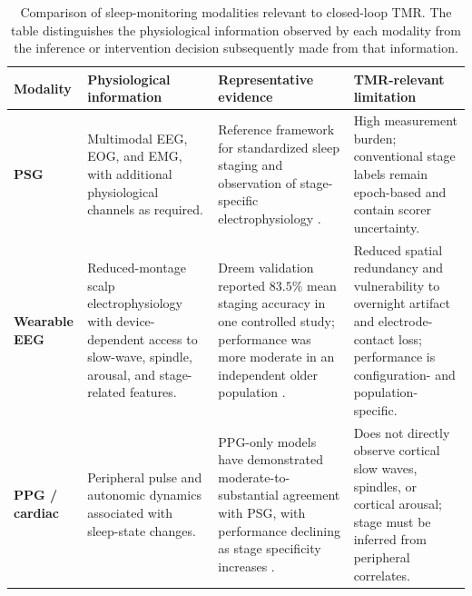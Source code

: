 \begin{table}[t]

\centering

\caption{
Comparison of sleep-monitoring modalities relevant to closed-loop TMR.
The table distinguishes the physiological information observed by each modality
from the inference or intervention decision subsequently made from that
information.
}

\label{tab:sensing_modalities_conceptual}

\footnotesize
\setlength{\tabcolsep}{4pt}
\renewcommand{\arraystretch}{1.22}

\begin{tabularx}{\textwidth}{
@{}
>{\raggedright\arraybackslash}p{2.1cm}
>{\raggedright\arraybackslash}X
>{\raggedright\arraybackslash}X
>{\raggedright\arraybackslash}X
@{}
}

\toprule

\textbf{Modality}
&
\textbf{Physiological information}
&
\textbf{Representative evidence}
&
\textbf{TMR-relevant limitation}
\\

\midrule

\textbf{PSG}
&
Multimodal EEG, EOG, and EMG, with additional physiological channels as
required.
&
Reference framework for standardized sleep staging and observation of
stage-specific electrophysiology
\citep{silber2007scoring}.
&
High measurement burden; conventional stage labels remain epoch-based and
contain scorer uncertainty.
\\

\addlinespace[1.2mm]

\textbf{Wearable EEG}
&
Reduced-montage scalp electrophysiology with device-dependent access to
slow-wave, spindle, arousal, and stage-related features.
&
Dreem validation reported \(83.5\%\) mean staging accuracy in one controlled
study; performance was more moderate in an independent older population
\citep{arnal2020dreem,ravindran2025dreem}.
&
Reduced spatial redundancy and vulnerability to overnight artifact and
electrode-contact loss; performance is configuration- and population-specific.
\\

\addlinespace[1.2mm]

\textbf{PPG / cardiac}
&
Peripheral pulse and autonomic dynamics associated with sleep-state changes.
&
PPG-only models have demonstrated moderate-to-substantial agreement with PSG,
with performance declining as stage specificity increases
\citep{korkalainen2020ppg}.
&
Does not directly observe cortical slow waves, spindles, or cortical arousal;
stage must be inferred from peripheral correlates.
\\


\end{tabularx}
\end{table}
